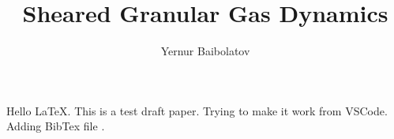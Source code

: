 \documentclass[preprint, aps, pra]{revtex4-1}
\begin{document}
  \title{Sheared Granular Gas Dynamics}
  \author{Yernur Baibolatov}
  \maketitle
  Hello \LaTeX. This is a test draft paper. Trying to make it work from VSCode. Adding BibTex file
  \cite{Brilliantov:2004book, Bodrova:2014epl_steep_distr, Brilliantov:2007pre_coll_dyn, 
  Brilliantov:2007pre_coll_adh, Schwager:2007gm_coll_dyn, Dilley:1993icarus_energy_loss, 
  Garzo:2012pre_maxwell_gas, DeSoria:2013pre_hydro_gas, Schaefer:1996jphys_force_schemes, 
  Garzo:2007pre_enskog_I, Garzo:2007pre_enskog_II, Garzo:1999pre_gran_mixture, 
  Geminard:2004pre_gran_pressure, Quinn:2010astro_hill_simplectic, Barrat:2002gm_binary_mix, 
  Hoffmann:2013astrolett_vertical_relax, Cuendet:2007jchem_md_simul, Uecker:2009pre_part_energy, 
  Morishima:2006icarus_dense_ring_simul, Ohtsuki:1998icarus_vel_disp, Salo:2010icarus_N_body, 
  Greenberg:1988icarus, Spahn:2006gamm_hydro_rings, Lois:2007pre_shear_flow, 
  Spahn:2004euro_lett_kinetic_fraggr, Spahn:2000icarus_stability_analysis, WisdomTremaine:1988astro}.


  
  
\end{document}
